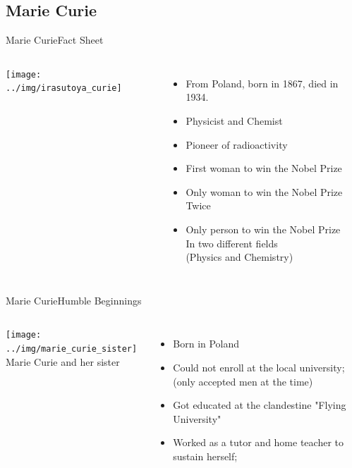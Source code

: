 \subsection{Marie Curie}
\begin{frame}{Marie Curie}{Fact Sheet}
  \begin{columns}
  \texttt{[image: ../img/irasutoya\_curie]}
  \\

    \begin{itemize}
      \item From Poland, born in 1867, died in 1934.
      \medskip

      \item Physicist and Chemist
      \medskip

      \item Pioneer of radioactivity
      \medskip

      \item First woman to win the Nobel Prize
      \medskip

      \item Only woman to win the Nobel Prize \alert{Twice}
      \medskip

      \item Only person to win the Nobel Prize\\
      \alert{In two different fields}\\
      (Physics and Chemistry)
    \end{itemize}
  \end{columns}
\end{frame}

\begin{frame}{Marie Curie}{Humble Beginnings}
  \begin{columns}
    \texttt{[image: ../img/marie\_curie\_sister]}\\
    Marie Curie and her sister
  \begin{itemize}
    \item Born in Poland
    \medskip

    \item Could not enroll at the local university;\\
      (only accepted men at the time)\medskip

    \item Got educated at the clandestine "Flying University"
    \medskip

    \item Worked as a tutor and home teacher to sustain herself;
  \end{itemize}
\end{columns}
\end{frame}

